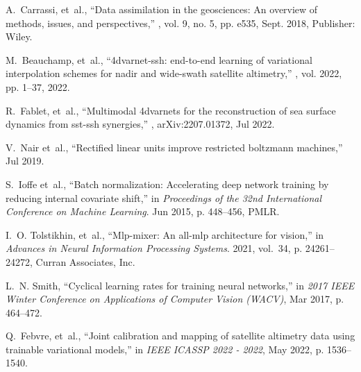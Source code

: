 \begin{bibunit}
\begin{thebibliography}{10}
A.~Carrassi, et~al.,
\newblock ``Data assimilation in the geosciences: {An} overview of methods,
  issues, and perspectives,''
, vol. 9, no. 5,
  pp. e535, Sept. 2018,
\newblock Publisher: Wiley.

M.~Beauchamp, et~al.,
\newblock ``4dvarnet-ssh: end-to-end learning of variational interpolation
  schemes for nadir and wide-swath satellite altimetry,''
, vol. 2022, pp.
  1–37, 2022.

R.~Fablet, et~al.,
\newblock ``Multimodal 4dvarnets for the reconstruction of sea surface dynamics
  from sst-ssh synergies,''
\newblock , arXiv:2207.01372, Jul 2022.

V.~Nair et~al.,
\newblock ``Rectified linear units improve restricted boltzmann machines,''
\newblock Jul 2019.

S.~Ioffe et~al.,
\newblock ``Batch normalization: Accelerating deep network training by reducing
  internal covariate shift,''
\newblock in {\em Proceedings of the 32nd International Conference on Machine
  Learning}. Jun 2015, p. 448–456, PMLR.

I.~O. Tolstikhin, et~al.,
\newblock ``Mlp-mixer: An all-mlp architecture for vision,''
\newblock in {\em Advances in Neural Information Processing Systems}. 2021,
  vol.~34, p. 24261–24272, Curran Associates, Inc.

L.~N. Smith,
\newblock ``Cyclical learning rates for training neural networks,''
\newblock in {\em 2017 IEEE Winter Conference on Applications of Computer
  Vision (WACV)}, Mar 2017, p. 464–472.

Q.~Febvre, et~al.,
\newblock ``Joint calibration and mapping of satellite altimetry data using
  trainable variational models,''
\newblock in {\em IEEE ICASSP 2022 - 2022}, May 2022, p. 1536–1540.

\end{thebibliography}


\end{bibunit}

